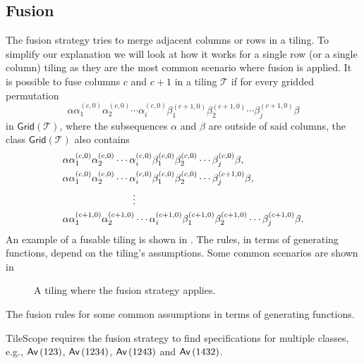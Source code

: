 \subsection{Fusion}
The fusion strategy tries to merge adjacent columns or rows in a tiling. To simplify our explanation we will look at how it works for a single row (or a single column) tiling as they are the most common scenario where fusion is applied. It is possible to fuse columns $c$ and $c+1$ in a tiling $\mathcal{T}$ if for every gridded permutation
\[
\alpha \alpha_1^{(c,0)}\alpha_2^{(c,0)}\dotsm\alpha_i^{(c,0)}\beta_1^{(c+1,0)}\beta_2^{(c+1,0)}\dotsm\beta_j^{(c+1,0)} \beta 
\]
in $\textsf{Grid}(\mathcal{T})$, where the subsequences $\alpha$ and $\beta$ are outside of said columns, the class $\textsf{Grid}(\mathcal{T})$ also contains
\begin{align*}
    &\alpha\alpha_1^{(c,0)}\alpha_2^{(c,0)}\dotsm\alpha_i^{(c,0)}\beta_1^{(c,0)}\beta_2^{(c,0)}\dotsm\beta_j^{(c,0)}\beta,\\
    &\alpha\alpha_1^{(c,0)}\alpha_2^{(c,0)}\dotsm\alpha_i^{(c,0)}\beta_1^{(c,0)}\beta_2^{(c,0)}\dotsm\beta_j^{(c+1,0)}\beta,\\
    &\hspace{2.5cm}\vdots\\
    &\alpha\alpha_1^{(c+1,0)}\alpha_2^{(c+1,0)}\dotsm\alpha_i^{(c+1,0)}\beta_1^{(c+1,0)}\beta_2^{(c+1,0)}\dotsm\beta_j^{(c+1,0)}\beta.
\end{align*}
An example of a fusable tiling is shown in . The rules, in terms of generating functions, depend on the tiling's assumptions. Some common scenarios are shown in 

\begin{figure}[ht!]
    \centering
    
    \caption{A tiling where the fusion strategy applies.}
    \label{fig:fusable}
\end{figure}

\begin{table}[ht!]
    \centering
    
    \caption{The fusion rules for some common assumptions in terms of generating functions.}
    \label{tab:fusegf}
\end{table}

TileScope requires the fusion strategy to find specifications for multiple classes, e.g., $\textsf{Av}\left(123\right)$, $\textsf{Av}\left(1234\right)$, $\textsf{Av}\left(1243\right)$ and $\textsf{Av}\left(1432\right)$.
